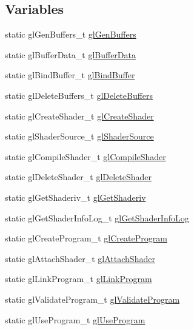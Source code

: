 \subsection*{Variables}
\begin{DoxyCompactItemize}
\item 
static gl\+Gen\+Buffers\+\_\+t \hyperlink{namespacetrimesh_ab1a53147bba32e80742ec1c91a6130f7}{gl\+Gen\+Buffers}
\item 
static gl\+Buffer\+Data\+\_\+t \hyperlink{namespacetrimesh_a4c87bbfb299e7881a16f5c1f0711ed88}{gl\+Buffer\+Data}
\item 
static gl\+Bind\+Buffer\+\_\+t \hyperlink{namespacetrimesh_abbd492b8f24232129584674de7b3aad8}{gl\+Bind\+Buffer}
\item 
static gl\+Delete\+Buffers\+\_\+t \hyperlink{namespacetrimesh_a289f75d8266249bd762435db1066de05}{gl\+Delete\+Buffers}
\item 
static gl\+Create\+Shader\+\_\+t \hyperlink{namespacetrimesh_a3be2581b68b54314d52f5fee9c07f0b6}{gl\+Create\+Shader}
\item 
static gl\+Shader\+Source\+\_\+t \hyperlink{namespacetrimesh_abe6c06e4d809a141322902265461d9a0}{gl\+Shader\+Source}
\item 
static gl\+Compile\+Shader\+\_\+t \hyperlink{namespacetrimesh_abe68cbd966de6a948bb2f6411953ec60}{gl\+Compile\+Shader}
\item 
static gl\+Delete\+Shader\+\_\+t \hyperlink{namespacetrimesh_a85b7707cd6e6ccb7be84c2458fc79343}{gl\+Delete\+Shader}
\item 
static gl\+Get\+Shaderiv\+\_\+t \hyperlink{namespacetrimesh_ae9c0544f820aa851b6397d1432a5d34c}{gl\+Get\+Shaderiv}
\item 
static gl\+Get\+Shader\+Info\+Log\+\_\+t \hyperlink{namespacetrimesh_a0d55575f5297e8534e2e631105ee6f99}{gl\+Get\+Shader\+Info\+Log}
\item 
static gl\+Create\+Program\+\_\+t \hyperlink{namespacetrimesh_a2a9405ef1402a7403cedfa163a1f301e}{gl\+Create\+Program}
\item 
static gl\+Attach\+Shader\+\_\+t \hyperlink{namespacetrimesh_ad938cb0d4d667bdd35789f46414fccb4}{gl\+Attach\+Shader}
\item 
static gl\+Link\+Program\+\_\+t \hyperlink{namespacetrimesh_ae55bbb20f2a1b45c134bd6500c29048b}{gl\+Link\+Program}
\item 
static gl\+Validate\+Program\+\_\+t \hyperlink{namespacetrimesh_a3f94b25ce93da00a88d586544169cd25}{gl\+Validate\+Program}
\item 
static gl\+Use\+Program\+\_\+t \hyperlink{namespacetrimesh_afe92c5fd4e0ced39e8b4bea7cccb6606}{gl\+Use\+Program}

\end{DoxyCompactItemize}
